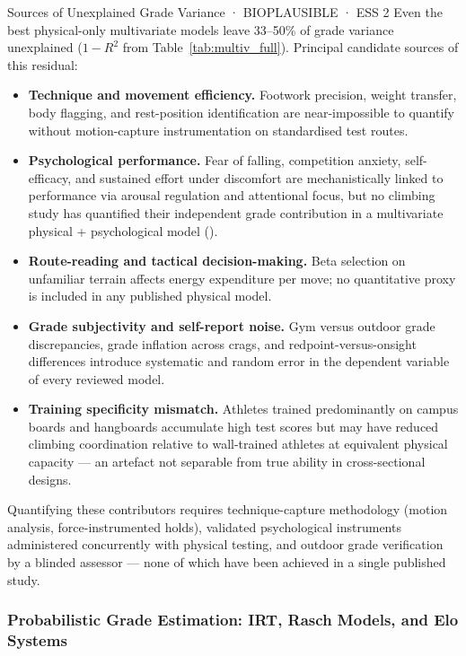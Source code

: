 \begin{bioplausbox}{Sources of Unexplained Grade Variance · BIOPLAUSIBLE · ESS 2}
Even the best physical-only multivariate models leave 33--50\% of grade variance unexplained ($1 - R^{2}$ from Table~\ref{tab:multiv_full}). Principal candidate sources of this residual:
\begin{itemize}
  \item \textbf{Technique and movement efficiency.} Footwork precision, weight transfer, body flagging, and rest-position identification are near-impossible to quantify without motion-capture instrumentation on standardised test routes.
  \item \textbf{Psychological performance.} Fear of falling, competition anxiety, self-efficacy, and sustained effort under discomfort are mechanistically linked to performance via arousal regulation and attentional focus, but no climbing study has quantified their independent grade contribution in a multivariate physical + psychological model (\toverify).
  \item \textbf{Route-reading and tactical decision-making.} Beta selection on unfamiliar terrain affects energy expenditure per move; no quantitative proxy is included in any published physical model.
  \item \textbf{Grade subjectivity and self-report noise.} Gym versus outdoor grade discrepancies, grade inflation across crags, and redpoint-versus-onsight differences introduce systematic and random error in the dependent variable of every reviewed model.
  \item \textbf{Training specificity mismatch.} Athletes trained predominantly on campus boards and hangboards accumulate high test scores but may have reduced climbing coordination relative to wall-trained athletes at equivalent physical capacity --- an artefact not separable from true ability in cross-sectional designs.
\end{itemize}
Quantifying these contributors requires technique-capture methodology (motion analysis, force-instrumented holds), validated psychological instruments administered concurrently with physical testing, and outdoor grade verification by a blinded assessor --- none of which have been achieved in a single published study.
\end{bioplausbox}

\subsubsection{Probabilistic Grade Estimation: IRT, Rasch Models, and Elo Systems}

